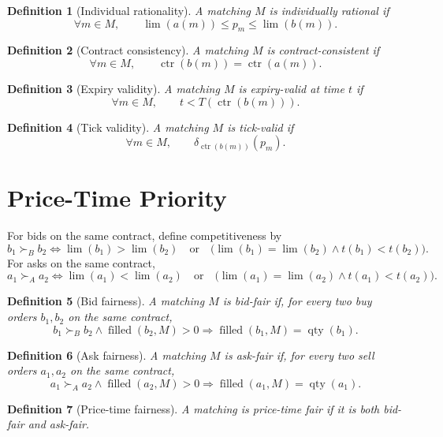 \documentclass[11pt]{article}
\newtheorem{definition}{Definition}[section]
\newcommand{\filled}{\operatorname{filled}}
\newcommand{\contract}{\operatorname{ctr}}
\newcommand{\limitp}{\operatorname{lim}}
\newcommand{\qty}{\operatorname{qty}}
\begin{document}
\begin{definition}[Individual rationality]
A matching \(M\) is individually rational if
\[
\forall m\in M,
\qquad
\limitp(a(m))\le p_m\le \limitp(b(m)).
\]
\end{definition}

\begin{definition}[Contract consistency]
A matching \(M\) is contract-consistent if
\[
\forall m\in M,
\qquad
\contract(b(m))=\contract(a(m)).
\]
\end{definition}

\begin{definition}[Expiry validity]
A matching \(M\) is expiry-valid at time \(t\) if
\[
\forall m\in M,
\qquad
 t<T(\contract(b(m))).
\]
\end{definition}

\begin{definition}[Tick validity]
A matching \(M\) is tick-valid if
\[
\forall m\in M,
\qquad
\delta_{\contract(b(m))}(p_m).
\]
\end{definition}

\section{Price-Time Priority}

For bids on the same contract, define competitiveness by
\[
b_1\succ_B b_2
\iff
\limitp(b_1)>\limitp(b_2)
\quad\text{or}\quad
\bigl(\limitp(b_1)=\limitp(b_2)\wedge t(b_1)<t(b_2)\bigr).
\]
For asks on the same contract,
\[
a_1\succ_A a_2
\iff
\limitp(a_1)<\limitp(a_2)
\quad\text{or}\quad
\bigl(\limitp(a_1)=\limitp(a_2)\wedge t(a_1)<t(a_2)\bigr).
\]

\begin{definition}[Bid fairness]
A matching \(M\) is bid-fair if, for every two buy orders \(b_1,b_2\) on the same contract,
\[
b_1\succ_B b_2\wedge \filled(b_2,M)>0
\Longrightarrow
\filled(b_1,M)=\qty(b_1).
\]
\end{definition}

\begin{definition}[Ask fairness]
A matching \(M\) is ask-fair if, for every two sell orders \(a_1,a_2\) on the same contract,
\[
a_1\succ_A a_2\wedge \filled(a_2,M)>0
\Longrightarrow
\filled(a_1,M)=\qty(a_1).
\]
\end{definition}

\begin{definition}[Price-time fairness]
A matching is price-time fair if it is both bid-fair and ask-fair.
\end{definition}
\end{document}
